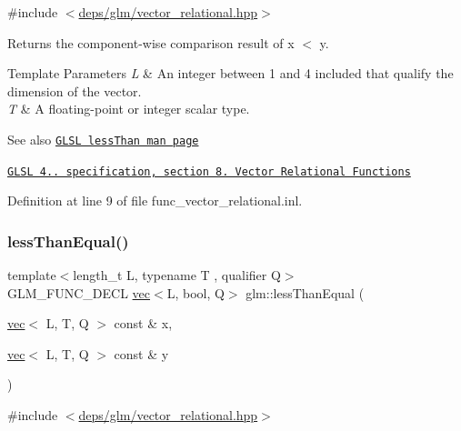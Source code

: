 {\ttfamily \#include $<$\hyperlink{vector__relational_8hpp}{deps/glm/vector\+\_\+relational.\+hpp}$>$}

Returns the component-\/wise comparison result of x $<$ y.


\begin{DoxyTemplParams}{Template Parameters}
{\em L} & An integer between 1 and 4 included that qualify the dimension of the vector. \\
\hline
{\em T} & A floating-\/point or integer scalar type.\\
\hline
\end{DoxyTemplParams}
\begin{DoxySeeAlso}{See also}
\href{http://www.opengl.org/sdk/docs/manglsl/xhtml/lessThan.xml}{\tt G\+L\+SL less\+Than man page} 

\href{http://www.opengl.org/registry/doc/GLSLangSpec.4.20.8.pdf}{\tt G\+L\+SL 4.. specification, section 8. Vector Relational Functions} 
\end{DoxySeeAlso}


Definition at line 9 of file func\+\_\+vector\+\_\+relational.\+inl.

\mbox{\label{group__core__func__vector__relational_ga51bf75522dbe1fa5e7806eb9b825ab6a}} 
\subsubsection{\texorpdfstring{less\+Than\+Equal()}{lessThanEqual()}}
{\footnotesize\ttfamily template$<$length\+\_\+t L, typename T , qualifier Q$>$ \\
G\+L\+M\+\_\+\+F\+U\+N\+C\+\_\+\+D\+E\+CL \hyperlink{structglm_1_1vec}{vec}$<$L, bool, Q$>$ glm\+::less\+Than\+Equal (\begin{DoxyParamCaption}\item[{\hyperlink{structglm_1_1vec}{vec}$<$ L, T, Q $>$ const \&}]{x,  }\item[{\hyperlink{structglm_1_1vec}{vec}$<$ L, T, Q $>$ const \&}]{y }\end{DoxyParamCaption})}



{\ttfamily \#include $<$\hyperlink{vector__relational_8hpp}{deps/glm/vector\+\_\+relational.\+hpp}$>$}

